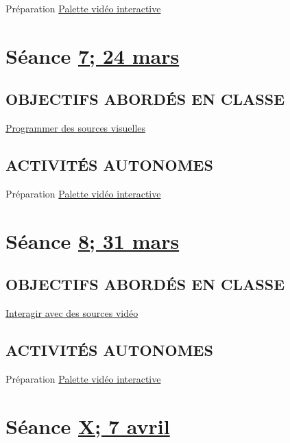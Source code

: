 \documentclass[
  french,
]{book}
\begin{document}
Préparation \protect\hyperlink{sommatif_4}{Palette vidéo interactive}

\hypertarget{semaine_8}{%
\section{\texorpdfstring{Séance \protect\hyperlink{semaine_8}{7; 24 mars}}{Séance 7; 24 mars}}\label{semaine_8}}

\hypertarget{objectifs-aborduxe9s-en-classe-7}{%
\subsection{OBJECTIFS ABORDÉS EN CLASSE}\label{objectifs-aborduxe9s-en-classe-7}}

\protect\hyperlink{programmer}{Programmer des sources visuelles}

\hypertarget{activituxe9s-autonomes-7}{%
\subsection{ACTIVITÉS AUTONOMES}\label{activituxe9s-autonomes-7}}

Préparation \protect\hyperlink{sommatif_4}{Palette vidéo interactive}

\hypertarget{semaine_9}{%
\section{\texorpdfstring{Séance \protect\hyperlink{semaine_9}{8; 31 mars}}{Séance 8; 31 mars}}\label{semaine_9}}

\hypertarget{objectifs-aborduxe9s-en-classe-8}{%
\subsection{OBJECTIFS ABORDÉS EN CLASSE}\label{objectifs-aborduxe9s-en-classe-8}}

\protect\hyperlink{interagir}{Interagir avec des sources vidéo}

\hypertarget{activituxe9s-autonomes-8}{%
\subsection{ACTIVITÉS AUTONOMES}\label{activituxe9s-autonomes-8}}

Préparation \protect\hyperlink{sommatif_4}{Palette vidéo interactive}

\hypertarget{semaine_10}{%
\section{\texorpdfstring{Séance \protect\hyperlink{semaine_10}{X; 7 avril}}{Séance X; 7 avril}}\label{semaine_10}}
\end{document}
